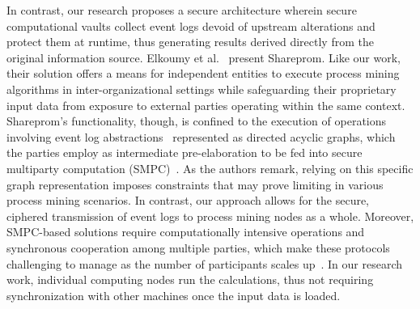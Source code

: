 In contrast, our research proposes a secure architecture wherein secure computational vaults collect event logs devoid of upstream alterations and protect them at runtime, thus generating results derived directly from the original information source. Elkoumy et al.~\cite{elkoumy2020shareprom,elkoumy2020secure} present Shareprom. Like our work, their solution offers a means for independent entities to execute process mining algorithms in inter-organizational settings while safeguarding their proprietary input data from exposure to external parties operating within the same context.
Shareprom's functionality, though, is confined to the execution of operations involving event log abstractions~\cite{FederatedPM2021} represented as directed acyclic graphs, which the parties employ as intermediate pre-elaboration to be fed into secure multiparty computation (SMPC)~\cite{SMPC2015}. As the authors remark, %
relying on this specific graph representation imposes constraints that may prove limiting in various process mining scenarios.
In contrast, our approach allows for the secure, ciphered transmission of event logs to process mining nodes as a whole. %
Moreover, SMPC-based solutions require computationally intensive operations and synchronous cooperation among multiple parties, which make these protocols challenging to manage as the number of participants scales up~\cite{SMPC2019}. In our research work, %
individual computing nodes run the calculations, %
thus not requiring synchronization with other machines once the input data is loaded. %

